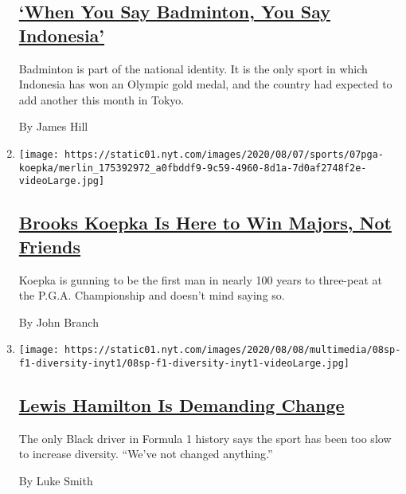 \begin{enumerate}
  \hypertarget{when-you-say-badminton-you-say-indonesia}{%
  \subsection{\texorpdfstring{\href{/2020/08/07/sports/badminton-indonesia.html}{`When
  You Say Badminton, You Say
  Indonesia'}}{`When You Say Badminton, You Say Indonesia'}}\label{when-you-say-badminton-you-say-indonesia}}

  Badminton is part of the national identity. It is the only sport in
  which Indonesia has won an Olympic gold medal, and the country had
  expected to add another this month in Tokyo.

  By James Hill
\item
  \texttt{[image: https://static01.nyt.com/images/2020/08/07/sports/07pga-koepka/merlin\_175392972\_a0fbddf9-9c59-4960-8d1a-7d0af2748f2e-videoLarge.jpg]}

  \hypertarget{brooks-koepka-is-here-to-win-majors-not-friends}{%
  \subsection{\texorpdfstring{\href{/2020/08/07/sports/brooks-koepka-pga-championship.html}{Brooks
  Koepka Is Here to Win Majors, Not
  Friends}}{Brooks Koepka Is Here to Win Majors, Not Friends}}\label{brooks-koepka-is-here-to-win-majors-not-friends}}

  Koepka is gunning to be the first man in nearly 100 years to
  three-peat at the P.G.A. Championship and doesn't mind saying so.

  By John Branch
\item
  \texttt{[image: https://static01.nyt.com/images/2020/08/08/multimedia/08sp-f1-diversity-inyt1/08sp-f1-diversity-inyt1-videoLarge.jpg]}

  \hypertarget{lewis-hamilton-is-demanding-change}{%
  \subsection{\texorpdfstring{\href{/2020/08/07/sports/autoracing/lewis-hamilton-formula-1-diversity.html}{Lewis
  Hamilton Is Demanding
  Change}}{Lewis Hamilton Is Demanding Change}}\label{lewis-hamilton-is-demanding-change}}

  The only Black driver in Formula 1 history says the sport has been too
  slow to increase diversity. ``We've not changed anything.''

  By Luke Smith
\end{enumerate}

